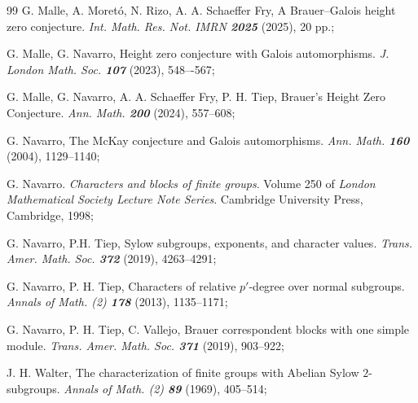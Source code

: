 \documentclass[12pt]{amsart}
\theoremstyle{theorem}
\theoremstyle{definition}
\begin{document}
\begin{thebibliography}{99}
		{\sc G. Malle, A. Moret\'o, N. Rizo, A. A. Schaeffer Fry}, A Brauer--Galois height zero conjecture. \emph{Int. Math. Res. Not. IMRN {\bf 2025}} (2025), 20 pp.;
		
		{\sc G. Malle, G. Navarro}, Height zero conjecture with Galois automorphisms. 
		\emph{J. London Math. Soc. {\bf 107}} (2023), 548{--}-567;
		
		 {\sc G. Malle, G. Navarro, A. A. Schaeffer Fry, P. H. Tiep}, Brauer's Height Zero Conjecture. \emph{Ann. Math. {\bf200}} (2024), 557--608;
		
		 {\sc G. Navarro}, The McKay conjecture and Galois automorphisms. \emph{Ann. Math. {\bf160}} (2004), 1129--1140;
		
		 {\sc G. Navarro}. \emph{Characters and blocks of finite groups}. Volume 250 of \emph{London Mathematical Society Lecture Note Series}. Cambridge University Press, Cambridge, 1998;
		
		{\sc G. Navarro, P.H. Tiep}, Sylow subgroups, exponents, and character values. \emph{Trans. Amer. Math. Soc. {\bf 372}} (2019), 4263--4291;
		
		{\sc G. Navarro, P. H. Tiep}, Characters of relative $p'$-degree over
		normal subgroups. \emph{Annals of Math. (2) \bf 178} (2013), 1135--1171;
		
		{\sc G. Navarro, P. H. Tiep, C. Vallejo}, Brauer correspondent blocks with one simple module. \emph{Trans. Amer. Math. Soc. \bf{371}} (2019), 903--922;
		
		{\sc J. H. Walter}, The characterization of finite groups with Abelian Sylow
		$2$-subgroups. \emph{Annals of Math. (2) \bf89} (1969), 405--514;
		
	\end{thebibliography}
\end{document}
